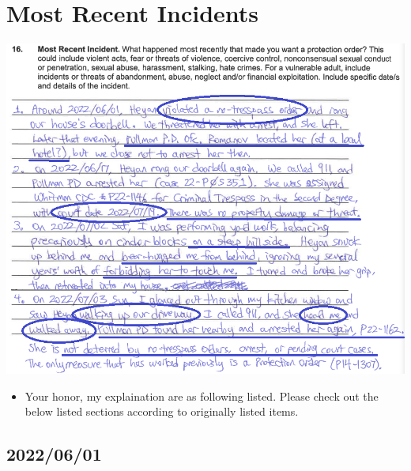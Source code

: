 \documentclass[9pt, b5paper]{article}
\begin{document}
\section{Most Recent Incidents}
\label{sec-4}

\includegraphics[width=.9\linewidth]{./pic/dearCousin_20220919_183412.png}
\begin{itemize}
\item Your honor, my explaination are as following listed. Please check out the below listed sections according to originally listed items.
\end{itemize}
\subsection{2022/06/01}
\label{sec-4-1}
\end{document}
